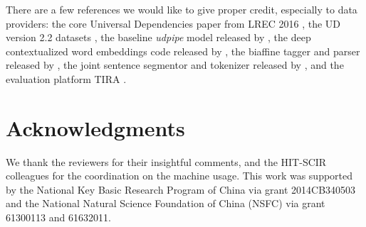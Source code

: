 \documentclass[11pt,a4paper]{article}
\begin{document}
There are a few references we would like to
give proper credit, especially to data providers:
the core Universal Dependencies paper from LREC 2016 \cite{ud},
the UD version 2.2 datasets \cite{ud22testdata}, 
the baseline \textit{udpipe} model released by \citet{udpipe},
the deep contextualized word embeddings code released by \citet{N18-1202},
the biaffine tagger and parser released by \citet{dozat-qi-manning:2017:K17-3},
the joint sentence segmentor and tokenizer released by \citet{delhoneux-EtAl:2017:K17-3},
and the evaluation platform TIRA \cite{tira}.

\section*{Acknowledgments}
We thank the reviewers for their insightful comments, and the HIT-SCIR colleagues for the coordination on the machine usage.
This work was supported by the National Key Basic Research Program of China
via grant 2014CB340503 and the National Natural Science Foundation of China (NSFC)
via grant 61300113 and 61632011.
\end{document}
